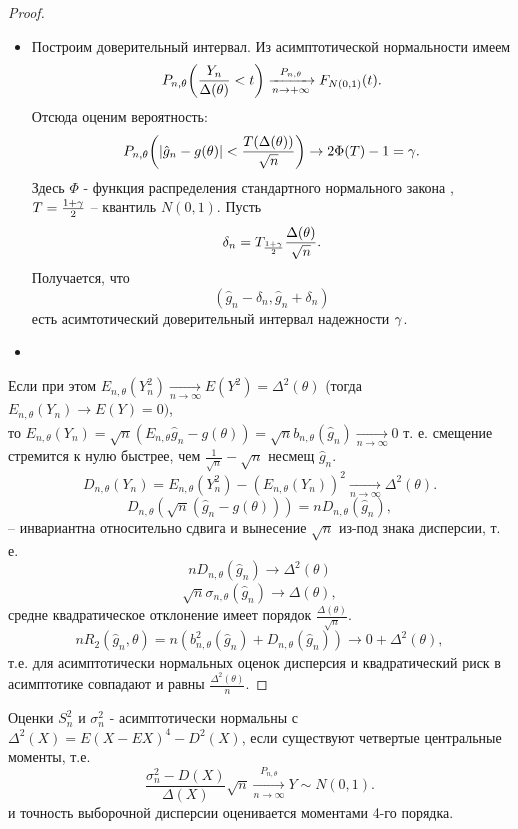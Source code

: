 \begin{proof}
    \enewline
    \begin{itemize}
        \item Построим доверительный интервал. Из асимптотической нормальности 
            имеем
            \[
                P_{n, \theta}\parens*{\frac{Y_n}{\Delta(\theta)} < t}
                \xrightarrow[n \to +\infty]{P_{n, \theta}} F_{N(0, 1)}(t)
            .\]
            Отсюда оценим вероятность:
            \[
                P_{n, \theta}\parens*{|\hat{g}_n - g(\theta)| < 
                \frac{T(\Delta(\theta))}{\sqrt{n}}} \to 2 \Phi(T) - 1 = \gamma
            .\]
            Здесь $\Phi$ - функция распределения стандартного нормального закона
            , $T = \frac{1 + \gamma}{2}$ -- квантиль $N(0, 1)$. Пусть
            \[
                \delta_n = T_{\frac{1 + \gamma}{2}} \frac{\Delta(\theta)}{\sqrt{n}}
            .\]
            Получается, что
            \[
                (\hat{g}_n - \delta_n, \hat{g}_n + \delta_n)
            \]
            есть асимтотический доверительный интервал надежности $\gamma$.
        \item 
    \end{itemize}
    Если при этом $E_{n, \theta}(Y_n^2) \xrightarrow[n \to \infty]{} E(Y^2) = 
    \Delta^2(\theta)$ (тогда $E_{n, \theta}(Y_n) \xrightarrow[]{} E(Y) = 0)$, \\
    то $E_{n, \theta}(Y_n) = \sqrt{n}(E_{n, \theta}\hat{g}_n - g(\theta)) = 
    \sqrt{n}b_{n, \theta}(\hat{g}_n) \xrightarrow[n \to \infty]{} 0$
    т. е. смещение стремится к нулю быстрее, чем $\frac{1}{\sqrt{n}} - 
    \sqrt{n}$ несмещ $\hat{g}_n$.
    \[
        D_{n, \theta}(Y_n) = E_{n, \theta}(Y_n^2) - (E_{n, \theta}(Y_n))^2 
        \xrightarrow[n \to \infty]{} \Delta^2(\theta)
    .\]
    \[
        D_{n, \theta}(\sqrt{n}(\hat{g}_n - g(\theta))) = nD_{n, \theta}
        (\hat{g}_n)
    ,\] -- инвариантна относительно сдвига и вынесение $\sqrt{n}$ из-под знака 
    дисперсии, т. е.
    \[
        nD_{n, \theta}(\hat{g}_n) \xrightarrow[]{} \Delta^2(\theta)
    \]
    \[
        \sqrt{n}\sigma_{n, \theta}(\hat{g}_n) \xrightarrow[]{} \Delta(\theta)
    ,\]
    средне квадратическое отклонение имеет порядок 
    $\frac{\Delta(\theta)}{\sqrt{n}}$.
    \[
        nR_2(\hat{g}_n, \theta) = n(b_{n, \theta}^2(\hat{g}_n) + 
        D_{n, \theta}(\hat{g}_n)) \xrightarrow[]{} 0 + \Delta^2(\theta)
    ,\]
    т.е. для асимптотически нормальных оценок дисперсия и квадратический 
    риск в асимптотике совпадают и равны $\frac{\Delta^2(\theta)}{n}$.
\end{proof}

\begin{proposition}
    Оценки $S^2_n$ и $\sigma^2_n$ - асимптотически нормальны с 
    $\Delta^2(X) = E(X - EX)^4 - D^2(X)$, если существуют четвертые 
    центральные моменты, т.е. 
    \[
      \frac{\sigma^2_n - D(X)}{\Delta(X)}\sqrt{n} 
      \xrightarrow[n \to \infty]{P_{n, \theta}} Y \sim N(0, 1)  
    .\] и точность выборочной дисперсии оценивается моментами 4-го порядка.
\end{proposition}


